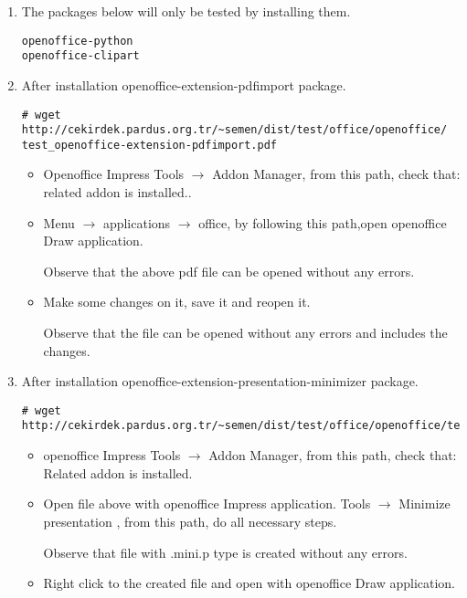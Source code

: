\documentclass[a4paper,10pt]{article}
\begin{document}
\begin{enumerate}
 \item The packages below will only be tested by installing them.
\begin{verbatim}
openoffice-python
openoffice-clipart
\end{verbatim}

 \item After installation openoffice-extension-pdfimport package.
\begin{verbatim}
# wget http://cekirdek.pardus.org.tr/~semen/dist/test/office/openoffice/
test_openoffice-extension-pdfimport.pdf
\end{verbatim}

\begin{itemize}
\item Openoffice Impress Tools $\rightarrow$ Addon Manager, from this path, check that: related addon is installed..

\item Menu $\rightarrow$ applications $\rightarrow$ office, by following this path,open openoffice Draw application.

Observe that the above pdf file can be opened without any errors.
\item Make some changes on it, save it and reopen it.

Observe that the file can be opened without any errors and includes the changes.

\end{itemize}
 
\item After installation openoffice-extension-presentation-minimizer package.
\begin{verbatim}
# wget http://cekirdek.pardus.org.tr/~semen/dist/test/office/openoffice/test_ooimpress.odp
\end{verbatim}

\begin{itemize}
\item openoffice Impress Tools $\rightarrow$ Addon Manager, from this path, check that: Related addon is installed.

\item Open file above with openoffice Impress application. Tools  $\rightarrow$  Minimize presentation , from this path, do all necessary steps.

Observe that file with .mini.p type is created without any errors.

\item Right click to the created file and open with openoffice Draw application.


\end{itemize}
\end{enumerate}
\end{document}
